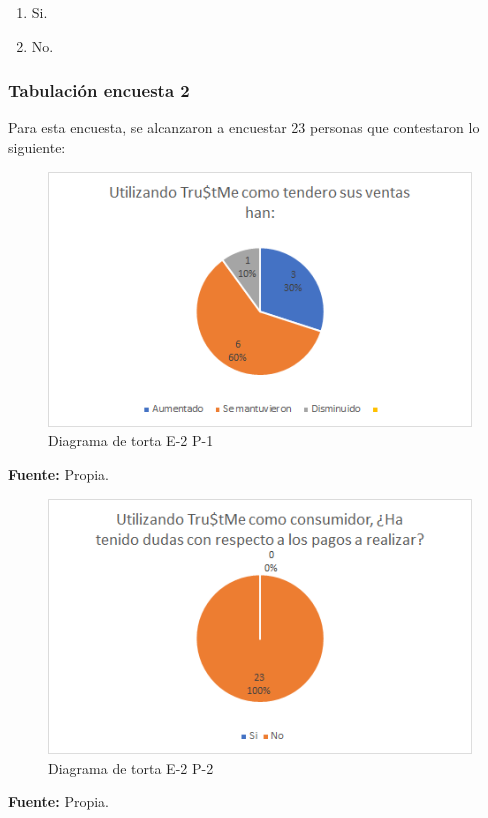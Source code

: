 {\begin{enumerate}
				\begin{enumerate}
					\item Si.
					\item No.
				\end{enumerate}
				
			\end{enumerate}
		
		\subsubsection*{Tabulación encuesta 2}
		
		{Para esta encuesta, se alcanzaron a encuestar 23 personas que contestaron lo siguiente:
			
			\begin{figure}[H]
				\centering
				\includegraphics[width=0.8\linewidth]{annexes/e2-p1.png}
				\caption{Diagrama de torta E-2 P-1}
			\end{figure}
			\begin{center}
				\textbf{Fuente:} Propia.
			\end{center}
			
			\begin{figure}[H]
				\centering
				\includegraphics[width=0.8\linewidth]{annexes/e2-p2.png}
				\caption{Diagrama de torta E-2 P-2}
			\end{figure}
			\begin{center}
				\textbf{Fuente:} Propia.
			\end{center}
			
}}
